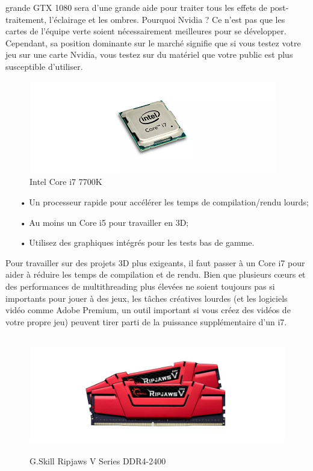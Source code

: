 \documentclass[ebook, 8pt, oneside, openany]{memoir}
\begin{document}
	grande GTX 1080 sera d'une grande aide pour traiter tous les effets de post-traitement, l'éclairage et
	les ombres. Pourquoi Nvidia ? Ce n'est pas que les cartes de l'équipe verte soient nécessairement
	meilleures pour se développer. Cependant, sa position dominante sur le marché signifie que si vous
	testez votre jeu sur une carte Nvidia, vous testez sur du matériel que votre public est plus susceptible
	d'utiliser.
	\begin{figure}[h]
		\begin{center}\includegraphics[height = 115pt]{3d_cpu.png}\end{center}
		\caption{Intel Core i7 7700K}
		\label{Intel Core i7 7700K}
	\end{figure}
	\begin{itemize}
		\item[• Un processeur rapide pour accélérer les temps de compilation/rendu lourds;]
		\item[• Au moins un Core i5 pour travailler en 3D;]
		\item[• Utilisez des graphiques intégrés pour les tests bas de gamme.]
	\end{itemize}
	Pour travailler sur des projets 3D plus exigeants, il faut passer à un Core i7 pour aider à réduire les
	temps de compilation et de rendu. Bien que plusieurs cœurs et des performances de multithreading plus
	élevées ne soient toujours pas si importants pour jouer à des jeux, les tâches créatives lourdes (et les
	logiciels vidéo comme Adobe Premium, un outil important si vous créez des vidéos de votre propre jeu)
	peuvent tirer parti de la puissance supplémentaire d'un i7.
	\newpage \begin{figure}[h]
		\begin{center}\includegraphics[height = 145pt]{2d_memory_ram.png}\end{center}
		\caption{G.Skill Ripjaws V Series DDR4-2400}
		\label{G.Skill Ripjaws V Series DDR4-2400}
	\end{figure}
\end{document}
